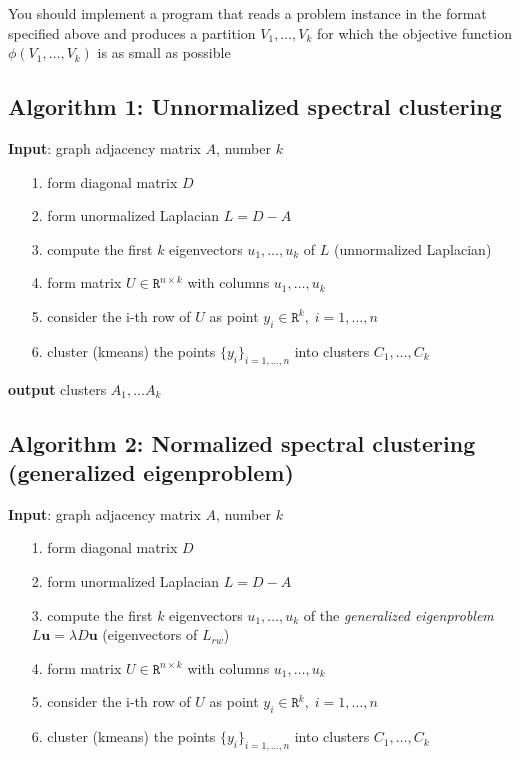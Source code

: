 \documentclass[a4paper,12pt]{article}
\begin{document}
You should implement a program that reads a problem instance in the format specified above and
produces a partition $V_1 , \dots, V_k$ for which the objective function $\phi(V_1 , \dots, V_k)$ is as small as possible

\subsection{Algorithm 1: Unnormalized spectral clustering}

\textbf{Input}: graph adjacency matrix $A$, number $k$
\begin{itemize}
\item[1. ] form diagonal matrix $D$
\item[2. ] form unormalized Laplacian $L = D - A$
\item[3. ] compute the first $k$ eigenvectors $u_1 , \dots, u_k$ of $L$ (unnormalized Laplacian)
\item[4. ] form matrix $U \in \texttt{R}^{n \times k}$ with columns $u_1, \dots, u_k$
\item[5. ] consider the i-th row of $U$ as point $y_i \in \texttt{R}^k, \; i=1, \dots, n$
\item[6. ] cluster (kmeans) the points $\{y_i\}_{i=1, \dots, n}$ into clusters $C_1, \dots, C_k$
\end{itemize}

\textbf{output} clusters $A_1, \dots A_k$

\subsection{Algorithm 2: Normalized spectral clustering (generalized eigenproblem)}

\textbf{Input}: graph adjacency matrix $A$, number $k$
\begin{itemize}
\item[1. ] form diagonal matrix $D$
\item[2. ] form unormalized Laplacian $L = D − A$
\item[3. ] compute the first $k$ eigenvectors $u_1 , \dots, u_k$ of the
\textit{generalized eigenproblem} $L \mathbf{u} = \lambda D \mathbf{u}$
(eigenvectors of $L_{rw}$)
\item[4. ] form matrix $U \in \texttt{R}^{n \times k}$ with columns $u_1, \dots, u_k$
\item[5. ] consider the i-th row of $U$ as point $y_i \in \texttt{R}^k, \; i=1, \dots, n$
\item[6. ] cluster (kmeans) the points $\{y_i\}_{i=1, \dots, n}$ into clusters $C_1, \dots, C_k$
\end{itemize}
\end{document}
